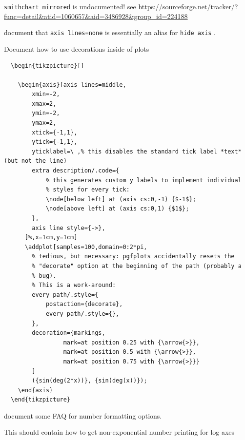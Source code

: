 \documentclass[a4paper]{article}
\begin{document}
\begin{bugtracker}
\begin{doctodo}[+]
\end{doctodo}

\begin{doctodo}[+]
	\verb|smithchart mirrored| is undocumented! see \url{https://sourceforge.net/tracker/?func=detail&atid=1060657&aid=3486928&group_id=224188}
\end{doctodo}

\begin{doctodo}[+]
	document that \verb|axis lines=none| is essentially an alias for \verb|hide axis| .
\end{doctodo}

\begin{doctodo}[+]
	Document how to use decorations inside of plots
\begin{verbatim}
  \begin{tikzpicture}[]

    \begin{axis}[axis lines=middle,
        xmin=-2,
        xmax=2,
        ymin=-2,
        ymax=2,
        xtick={-1,1},
        ytick={-1,1},
        yticklabel=\ ,% this disables the standard tick label *text* (but not the line)
        extra description/.code={
            % this generates custom y labels to implement individual
            % styles for every tick:
            \node[below left] at (axis cs:0,-1) {$-1$};
            \node[above left] at (axis cs:0,1) {$1$};
        },
        axis line style={->},
      ]%,x=1cm,y=1cm]
      \addplot[samples=100,domain=0:2*pi,
        % tedious, but necessary: pgfplots accidentally resets the
        % "decorate" option at the beginning of the path (probably a
        % bug).
        % This is a work-around:
        every path/.style={
            postaction={decorate},
            every path/.style={},
        },
        decoration={markings,
                 mark=at position 0.25 with {\arrow{>}},
                 mark=at position 0.5 with {\arrow{>}},
                 mark=at position 0.75 with {\arrow{>}}}
        ]
        ({sin(deg(2*x))}, {sin(deg(x))});
    \end{axis}
  \end{tikzpicture} 
\end{verbatim}

\end{doctodo}


\begin{doctodo}[+]
	document some FAQ for number formatting options.

	This should contain how to get non-exponential number printing for log axes
\end{doctodo}


\end{bugtracker}
\end{document}
